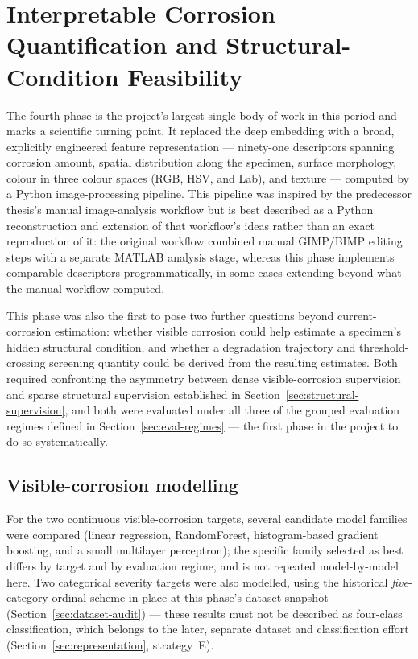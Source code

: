 \section{Interpretable Corrosion Quantification and Structural-Condition Feasibility}
\label{sec:phase3}

The fourth phase is the project's largest single body of work in this
period and marks a scientific turning point. It replaced the deep embedding
with a broad, explicitly engineered feature representation — ninety-one
descriptors spanning corrosion amount, spatial distribution along the
specimen, surface morphology, colour in three colour spaces (RGB, HSV, and
Lab), and texture — computed by a Python image-processing pipeline. This
pipeline was inspired by the predecessor thesis's manual image-analysis
workflow but is best described as a Python reconstruction and extension of
that workflow's ideas rather than an exact reproduction of it: the original
workflow combined manual GIMP/BIMP editing steps with a separate MATLAB
analysis stage, whereas this phase implements comparable descriptors
programmatically, in some cases extending beyond what the manual workflow
computed.

This phase was also the first to pose two further questions
beyond current-corrosion estimation: whether visible corrosion could help
estimate a specimen's hidden structural condition, and whether a
degradation trajectory and threshold-crossing screening quantity could be
derived from the resulting estimates. Both required confronting the
asymmetry between dense visible-corrosion supervision and sparse structural
supervision established in Section~\ref{sec:structural-supervision}, and
both were evaluated under all three of the grouped evaluation regimes
defined in Section~\ref{sec:eval-regimes} — the first phase in the project
to do so systematically.

\subsection{Visible-corrosion modelling}
\label{sec:phase3-corrosion}

For the two continuous visible-corrosion targets, several candidate model
families were compared (linear regression, RandomForest, histogram-based
gradient boosting, and a small multilayer perceptron); the specific
family selected as best differs by target and by evaluation regime, and is
not repeated model-by-model here. Two categorical severity targets were
also modelled, using the historical \emph{five}-category ordinal scheme in
place at this phase's dataset snapshot (Section~\ref{sec:dataset-audit}) —
these results must not be described as four-class classification, which
belongs to the later, separate dataset and classification effort
(Section~\ref{sec:representation}, strategy~E).

